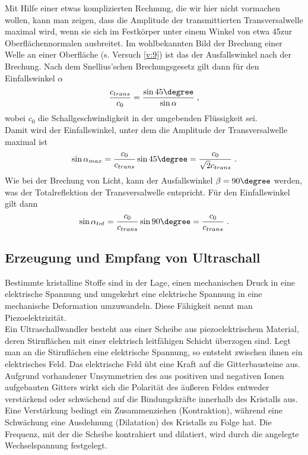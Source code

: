 \noindent
Mit Hilfe einer etwas komplizierten Rechnung, die wir hier nicht vormachen wollen, kann man zeigen, dass die Amplitude der transmittierten Transversalwelle maximal wird, wenn sie sich im Festkörper unter einem Winkel von etwa 45\degree zur Oberflächennormalen ausbreitet. Im wohlbekannten Bild der Brechung einer Welle an einer Oberfläche (s. Versuch \ref{v:9}) ist das der Ausfallswinkel nach der Brechung. Nach dem Snellius'schen Brechungsgesetz gilt dann für den Einfallswinkel $\alpha$
\begin{equation}
	\frac{c_{trans}}{c_0} = \frac{\sin 45\degree}{\sin \alpha}\; ,
\end{equation}
wobei $c_0$ die Schallgeschwindigkeit in der umgebenden Flüssigkeit sei.\\
Damit wird der Einfallswinkel, unter dem die Amplitude der Transversalwelle maximal ist
\begin{equation}
	\sin \alpha_{max} = \frac{c_0}{c_{trans}} \sin 45\degree = \frac{c_0}{\sqrt{2}c_{trans}}\; .
\end{equation}
Wie bei der Brechung von Licht, kann der Ausfallswinkel $\beta = 90\degree$ werden, was der Totalreflektion der Transversalwelle entspricht. Für den Einfallswinkel gilt dann
\begin{equation}
	\sin \alpha_{tot} = \frac{c_0}{c_{trans}} \sin 90\degree = \frac{c_0}{c_{trans}}\; .
\end{equation}

\subsection{Erzeugung und Empfang von Ultraschall}

Bestimmte kristalline Stoffe sind in der Lage, einen mechanischen Druck in eine elektrische Spannung und umgekehrt eine elektrische Spannung in eine mechanische Deformation umzuwandeln. Diese Fähigkeit nennt man Piezoelektrizität.\\

\noindent
Ein Ultraschallwandler besteht aus einer Scheibe aus piezoelektrischem Material, deren Stirnflächen mit einer elektrisch leitfähigen Schicht überzogen sind. Legt man an die Stirnflächen eine elektrische Spannung, so entsteht zwischen ihnen ein elektrisches Feld. Das elektrische Feld übt eine Kraft auf die Gitterbausteine aus. Aufgrund vorhandener Unsymmetrien des aus positiven und negativen Ionen aufgebauten Gitters wirkt sich die Polarität des äußeren Feldes entweder verstärkend oder schwächend auf die Bindungskräfte innerhalb des Kristalls aus. Eine Verstärkung bedingt ein Zusammenziehen (Kontraktion), während eine Schwächung eine Ausdehnung (Dilatation) des Kristalls zu Folge hat. Die Frequenz, mit der die Scheibe kontrahiert und dilatiert, wird durch die angelegte Wechselspannung festgelegt.\\

